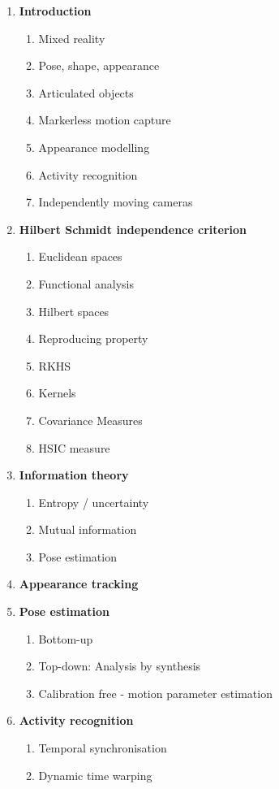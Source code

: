 \begin{enumerate}
\item{\textbf{Introduction}}
  \begin{enumerate}
    \item{Mixed reality}
        \item{Pose, shape, appearance}
        \item{Articulated objects}
        \item{Markerless motion capture}
        \item{Appearance modelling}
        \item{Activity recognition}
        \item{Independently moving cameras}
  \end{enumerate}
\item{\textbf{Hilbert Schmidt independence criterion}}
  \begin{enumerate}
    \item{Euclidean spaces}
    \item{Functional analysis}
    \item{Hilbert spaces}
    \item{Reproducing property}
    \item{RKHS}
    \item{Kernels}
    \item{Covariance Measures}
    \item{HSIC measure}
  \end{enumerate}
\item{\textbf{Information theory}}
  \begin{enumerate}
    \item{Entropy / uncertainty}
        \item{Mutual information}
        \item{Pose estimation}
          \end{enumerate}
\item{\textbf{Appearance tracking}}
\item{\textbf{Pose estimation}}
  \begin{enumerate}
    \item{Bottom-up}
        \item{Top-down: Analysis by synthesis}
        \item{Calibration free - motion parameter estimation}
          \end{enumerate}
\item{\textbf{Activity recognition}}
  \begin{enumerate}
    \item{Temporal synchronisation}
      \item{Dynamic time warping}
        \end{enumerate}
\end{enumerate}